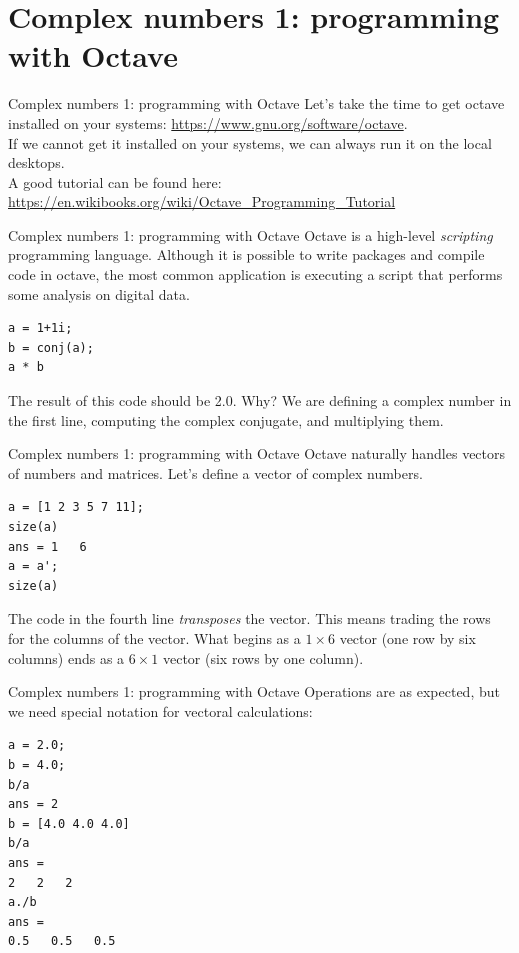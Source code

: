 \documentclass{beamer}
\begin{document}
\section{Complex numbers 1: programming with Octave}

\begin{frame}{Complex numbers 1: programming with Octave}
Let's take the time to get octave installed on your systems: \url{https://www.gnu.org/software/octave}.  \\ \vspace{0.5cm}
If we cannot get it installed on your systems, we can always run it on the local desktops. \\ \vspace{0.5cm}
A good tutorial can be found here: \\
\url{https://en.wikibooks.org/wiki/Octave_Programming_Tutorial}
\end{frame}

\begin{frame}[fragile]{Complex numbers 1: programming with Octave}
Octave is a high-level \textit{scripting} programming language.  Although it is possible to write packages and compile code in octave, the most common application is executing a script that performs some analysis on digital data. \\
\begin{verbatim}
a = 1+1i;
b = conj(a);
a * b
\end{verbatim}
The result of this code should be 2.0.  Why?  We are defining a complex number in the first line, computing the complex conjugate, and multiplying them.
\end{frame}

\begin{frame}[fragile]{Complex numbers 1: programming with Octave}
Octave naturally handles vectors of numbers and matrices.  Let's define a vector of complex numbers. \\
\begin{verbatim}
a = [1 2 3 5 7 11];
size(a)
ans = 1   6
a = a';
size(a)
\end{verbatim}
The code in the fourth line \textit{transposes} the vector.  This means trading the rows for the columns of the vector.  What begins as a $1 \times 6$ vector (one row by six columns) ends as a $6 \times 1$ vector (six rows by one column).
\end{frame}

\begin{frame}[fragile]{Complex numbers 1: programming with Octave}
Operations are as expected, but we need special notation for vectoral calculations:
\begin{verbatim}
a = 2.0;
b = 4.0;
b/a
ans = 2
b = [4.0 4.0 4.0]
b/a
ans =
2   2   2
a./b
ans =
0.5   0.5   0.5
\end{verbatim}
\end{frame}
\end{document}
